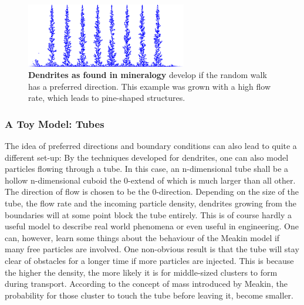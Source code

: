 \documentclass[twocolumn, 10pt]{scrartcl}
\begin{document}
                \begin{figure}
                    \center
                    \includegraphics[width=7cm]{img/dendrites.png}
                    \caption[Dendrites as found in mineralogy]
                        {\small\textbf{Dendrites as found in mineralogy} develop if the random walk has a preferred
                        direction. This example was grown with a high flow rate, which leads to pine-shaped
                        structures.}
                    \label{fig-dendrites}
                \end{figure}

            \subsubsection{A Toy Model: Tubes}
                The idea of preferred directions and boundary conditions can also lead to quite a different set-up:
                By the techniques developed for dendrites, one can also model particles flowing through a tube. In
                this case, an n-dimensional tube shall be a hollow n-dimensional cuboid the 0-extend of which is much
                larger than all other. The direction of flow is chosen to be the 0-direction. Depending on the size of
                the tube, the flow rate and the incoming particle density, dendrites growing from the boundaries will
                at some point block the tube entirely. This is of course hardly a useful model to describe real world
                phenomena or even useful in engineering. One can, however, learn some things about the behaviour of the
                Meakin model if many free particles are involved. One non-obvious result is that the tube will stay
                clear of obstacles for a longer time if more particles are injected. This is because the higher the
                density, the more likely it is for middle-sized clusters to form during transport. According to the
                concept of mass introduced by Meakin, the probability for those cluster to touch the tube before
                leaving it, become smaller.
\end{document}
